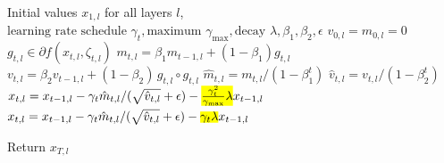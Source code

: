 \documentclass[]{fairmeta}
\newcommand{\highlight}[1]{%
  \setlength{\fboxsep}{0pt}%
  \colorbox{highlightcolor}{$#1$}%
}
\begin{document}
\begin{algorithm}[t]
    
    
        
    
        
        
    
        

\begin{algorithmic}[1]
     Initial values $x_{1,l}$ for all layers $l$, 
     $\text{learning rate schedule } \gamma_t, \text{maximum } \gamma_{\max}, \text{decay } \lambda, \beta_1, \beta_2, \epsilon$
    \State $v_{0,l} = m_{0,l} = 0$
        \State $g_{t,l} \in \partial f(x_{t,l}, \zeta_{t,l})$ 
        \State $m_{t,l} = \beta_1 m_{t-1,l} + (1-\beta_1) g_{t,l} $ 
        \State $v_{t,l} = \beta_2 v_{t-1,l} + (1-\beta_2) \, g_{t,l} \circ g_{t,l}$
        \State $\hat{m}_{t,l} = m_{t,l} / (1-\beta_1^t)$
        \State $\hat{v}_{t,l} = v_{t,l} / (1-\beta_2^t)$
            \State $x_{t,l} = x_{t-1,l} -\gamma_t \hat{m}_{t,l} /(\sqrt{\hat{v}_{t,l}}+\epsilon) - 
        \highlight{\frac{\gamma^2_t}{\gamma_{\max}} \lambda}
         x_{t-1,l}$ 
        \Else
            \State $x_{t,l} = x_{t-1,l} -\gamma_t \hat{m}_{t,l} /(\sqrt{\hat{v}_{t,l}}+\epsilon) - 
        \highlight{\gamma_t \lambda}
         x_{t-1,l}$ 
        \EndIf
        
    \EndFor
    \EndFor
    \State Return $x_{T,l}$
\end{algorithmic}
\caption{\label{alg:corrected}Adam with Corrected Weight Decay (AdamC)}
\end{algorithm}
\end{document}
